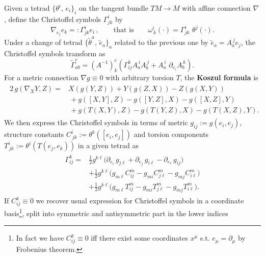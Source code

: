 \documentclass[../geometry_main.tex]{subfiles}
\begin{document}
\begin{mytheorem}
Given a tetrad $\{\theta^i,\, e_i\}_i$ on the tangent bundle $TM\to M$ with affine connection \(\nabla\), define the Christoffel symbols \(\Gamma^i_{jk}\) by
\begin{equation}
    \nabla_{e_j} e_k =: \Gamma^i_{jk} e_i\,,\qquad\text{that is}\qquad \omega^i_{\, k}(\cdot) = \Gamma^i_{ jk}\,\, \theta^j(\cdot).
\end{equation}
Under a change of tetrad \(\{\tilde{\theta}^a,\, \tilde{e}_a\}_a\) related to the previous one by \(\tilde{e}_a = A_a^{\, j} e_j\), the Christoffel symbols transform as
\begin{equation}
    \tilde{\Gamma}^c_{ab} = (A^{-1})^c_k \left( \Gamma^k_{ij} A_a^{\, i} A_b^{\, j} + A_a^{\, i}\,\,\partial_{e_i} A_b^{\, k}  \right).
\end{equation}
%
For a metric connection $\nabla g\equiv 0$ with arbitrary torsion $T$, the \textbf{Koszul formula} is
\begin{align}\label{eq:koszul_formula}
\begin{aligned}
    2\,g(\nabla_X Y, Z) ={}& X\!\left(g(Y,Z)\right) + Y\!\left(g(Z,X)\right) - Z\!\left(g(X,Y)\right)\\
    &\, + g([X,Y],Z) - g([Y,Z],X) - g([X,Z],Y) \\
    & \,+ g\!\left(T(X,Y),Z\right) - g\!\left(T(Y,Z),X\right) - g\!\left(T(X,Z),Y\right).
\end{aligned}
\end{align}
We then express the Christoffel symbols in terms of metric $g_{ij} := g(e_i, e_j)$, structure constants \(C^i_{\, jk}:=\theta^k([e_i,e_j])\) and torsion components \(T^i_{\, jk}:=\theta^i(T(e_j,e_k))\) in a given tetrad as
\begin{align}\label{eq:koszul_formula_cohordinates}
\begin{aligned}
    \Gamma_{ij}^k=&\tfrac{1}{2} g^{k\ell} \Big( \partial_{e_i}\,g_{j \ell} + \partial_{e_j}\,g_{i \ell} - \partial_{e_\ell}\,g_{i j}\Big)\\
    & + \tfrac{1}{2} g^{k\ell} \Big( g_{m \ell} C^m_{ij}  - g_{m i} C^m_{j \ell}  - g_{m j} C^m_{i \ell}\Big) \\
    & +\tfrac{1}{2} g^{k\ell} \Big( g_{m \ell} T^m_{ij} -g_{m i} T^m_{j \ell} - g_{m j} T^m_{i \ell}  \Big).
\end{aligned}
\end{align}
If $C_{ij}^k\equiv 0$ we recover usual expression for Christoffel symbols in a coordinate basis\footnote{In fact we have $C_{ij}^k\equiv 0$ iff there exist some coordinates $x^\mu$ s.t. $e_\mu=\partial_\mu$ by Frobenius theorem.}, split into symmetric and antisymmetric part in the lower indices 

\end{mytheorem}
\end{document}
